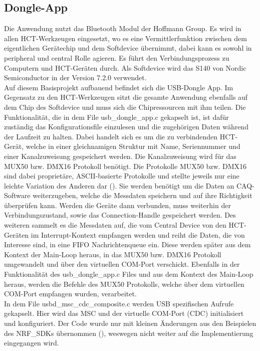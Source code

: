 \subsection{Dongle-App}
Die Anwendung nutzt das Bluetooth Modul der Hoffmann Group. Es wird in allen \ac{HCT}-Werkzeugen eingesetzt, wo es eine Vermittlerfunktion zwischen dem eigentlichen Gerätechip und dem Softdevice übernimmt, dabei kann es sowohl in peripheral und central Rolle agieren. Es führt den Verbindungsprozess zu Computern und \ac{HCT}-Geräten durch. Als Softdevice wird das S140 von Nordic Semiconductor in der Version 7.2.0 verwendet. \\
Auf diesem Basisprojekt aufbauend befindet sich die \ac{USB}-Dongle App. Im Gegensatz zu den \ac{HCT}-Werkzeugen sitzt die gesamte Anwendung ebenfalls auf dem Chip des Softdevice und muss sich die Chipressourcen mit ihm teilen. Die Funktionalität, die in dem File usb\_dongle\_app.c gekapselt ist, ist dafür zuständig das Konfigurationsfile einzulesen und die zugehörigen Daten während der Laufzeit zu halten. Dabei handelt sich es um die zu verbindenden \ac{HCT}-Gerät, welche in einer gleichnamigen Struktur mit Name, Seriennummer und einer Kanalzuweisung gespeichert werden. Die Kanalzuweisung wird für das MUX50 bzw. DMX16 Protokoll benötigt. Die Protokolle MUX50 bzw. DMX16 sind dabei proprietäre, \ac{ASCII}-basierte Protokolle und stellte jeweils nur eine leichte Variation des Anderen dar (\cite[s. 33]{HCT_Windows_App_Manual}). Sie werden benötigt um die Daten an \ac{CAQ}-Software weiterzugeben, welche die Messdaten speichern und auf ihre Richtigkeit überprüfen kann. Werden die Geräte dann verbunden, muss weiterhin der Verbindungszustand, sowie das Connection-Handle gespeichert werden. Des weiteren sammelt es die Messdaten auf, die vom Central Device von den \ac{HCT}-Geräten im Interrupt-Kontext empfangen werden und reiht die Daten, die von Interesse sind, in eine \ac{FIFO} Nachrichtenqueue ein. Diese werden später aus dem Kontext der Main-Loop heraus, in das MUX50 bzw. DMX16 Protokoll umgewandelt und über den virtuellen COM-Port verschickt. Ebenfalls in der Funktionalität des usb\_dongle\_app.c Files und aus dem Kontext des Main-Loop heraus, werden die Befehle des MUX50 Protokolls, welche über dem virtuellen COM-Port empfangen wurden, verarbeitet.\\
In dem File usbd\_msc\_cdc\_composite.c werden \ac{USB} spezifischen Aufrufe gekapselt. Hier wird das \ac{MSC} und der virtuelle COM-Port (\ac{CDC}) initialisiert und konfiguriert. Der Code wurde nur mit kleinen Änderungen aus den Beispielen des NRF\_SDKs übernommen (\cite{NRF_USB_examples}), weswegen nicht weiter auf die Implementierung eingegangen wird.\\
